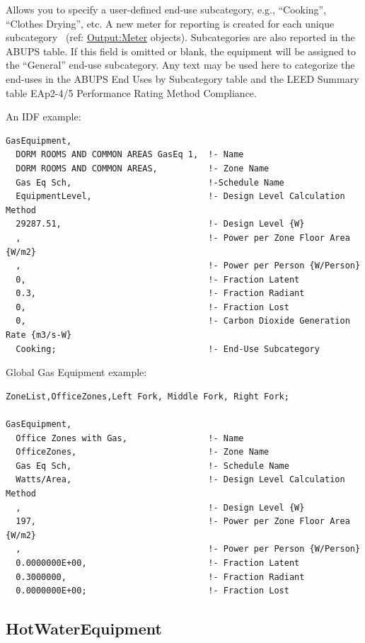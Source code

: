 Allows you to specify a user-defined end-use subcategory, e.g., ``Cooking'', ``Clothes Drying'', etc. A new meter for reporting is created for each unique subcategory~ (ref: \hyperref[outputmeter-and-outputmetermeterfileonly]{Output:Meter} objects). Subcategories are also reported in the ABUPS table. If this field is omitted or blank, the equipment will be assigned to the ``General'' end-use subcategory. Any text may be used here to categorize the end-uses in the ABUPS End Uses by Subcategory table and the LEED Summary table EAp2-4/5 Performance Rating Method Compliance.

An IDF example:

\begin{lstlisting}
GasEquipment,
  DORM ROOMS AND COMMON AREAS GasEq 1,  !- Name
  DORM ROOMS AND COMMON AREAS,          !- Zone Name
  Gas Eq Sch,                           !-Schedule Name
  EquipmentLevel,                       !- Design Level Calculation Method
  29287.51,                             !- Design Level {W}
  ,                                     !- Power per Zone Floor Area {W/m2}
  ,                                     !- Power per Person {W/Person}
  0,                                    !- Fraction Latent
  0.3,                                  !- Fraction Radiant
  0,                                    !- Fraction Lost
  0,                                    !- Carbon Dioxide Generation Rate {m3/s-W}
  Cooking;                              !- End-Use Subcategory
\end{lstlisting}

Global Gas Equipment example:

\begin{lstlisting}
ZoneList,OfficeZones,Left Fork, Middle Fork, Right Fork;

GasEquipment,
  Office Zones with Gas,                !- Name
  OfficeZones,                          !- Zone Name
  Gas Eq Sch,                           !- Schedule Name
  Watts/Area,                           !- Design Level Calculation Method
  ,                                     !- Design Level {W}
  197,                                  !- Power per Zone Floor Area {W/m2}
  ,                                     !- Power per Person {W/Person}
  0.0000000E+00,                        !- Fraction Latent
  0.3000000,                            !- Fraction Radiant
  0.0000000E+00;                        !- Fraction Lost
\end{lstlisting}

\subsection{HotWaterEquipment}\label{hotwaterequipment}

